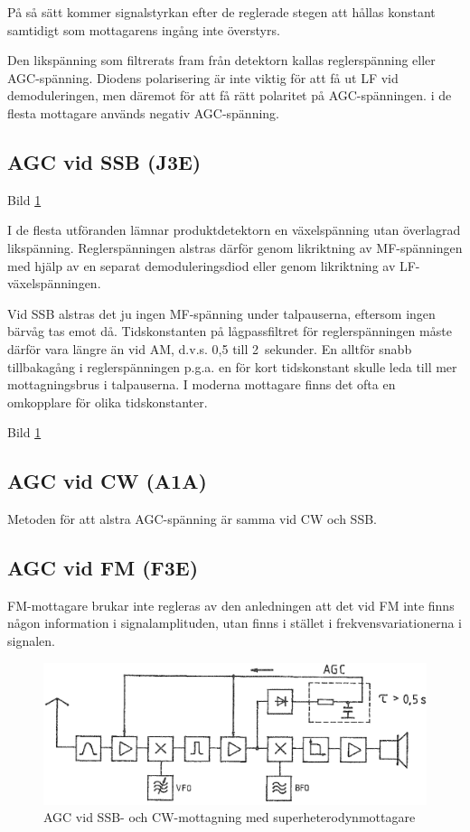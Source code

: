På så sätt kommer signalstyrkan efter de reglerade stegen att hållas
konstant samtidigt som mottagarens ingång inte överstyrs.

Den likspänning som filtrerats fram från detektorn kallas
reglerspänning eller AGC-spänning. Diodens polarisering är inte viktig
för att få ut LF vid demoduleringen, men däremot för att få rätt
polaritet på AGC-spänningen. i de flesta mottagare används negativ
AGC-spänning.

\subsection{AGC vid SSB (J3E)}

Bild \ref{fig:bildII4-21}

I de flesta utföranden lämnar produktdetektorn en växelspänning utan
överlagrad likspänning. Reglerspänningen alstras därför genom
likriktning av MF-spänningen med hjälp av en separat demoduleringsdiod
eller genom likriktning av LF-växelspänningen.

Vid SSB alstras det ju ingen MF-spänning under talpauserna, eftersom
ingen bärvåg tas emot då.
Tidskonstanten på lågpassfiltret för reglerspänningen måste därför vara längre
än vid AM, d.v.s. 0,5 till 2~sekunder.
En alltför snabb tillbakagång i reglerspänningen p.g.a. en för kort
tidskonstant skulle leda till mer mottagningsbrus i talpauserna.
I moderna mottagare finns det ofta en omkopplare för olika tidskonstanter.

Bild \ref{fig:bildII4-21}

\subsection{AGC vid CW (A1A)}

Metoden för att alstra AGC-spänning är samma vid CW och SSB.

\subsection{AGC vid FM (F3E)}

FM-mottagare brukar inte regleras av den anledningen att det vid FM
inte finns någon information i signalamplituden, utan finns i stället
i frekvensvariationerna i signalen.

\begin{figure}
  \includegraphics[width=\textwidth]{images/cropped_pdfs/bild_2_4-21.pdf}
  \caption{AGC vid SSB- och CW-mottagning med superheterodynmottagare}
  \label{fig:bildII4-21}
\end{figure}

